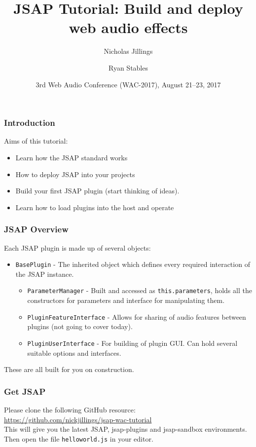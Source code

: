 \documentclass{beamer}
\title[JSAP]{JSAP Tutorial: Build and deploy web audio effects}
\author[Jillings and Stables]%
{Nicholas Jillings \and Ryan Stables}
\institute[BCU]
{
  Digital Media Technology Lab\\
  Birmingham City University\\
  Curzon Street, Birmingham, UK
}
\date[WAC 2017] %
{3rd Web Audio Conference (WAC-2017), August 21--23, 2017}
\begin{document}
 
\frame{\titlepage}

\begin{frame}
\frametitle{Introduction}

Aims of this tutorial:
\begin{itemize}
\item Learn how the JSAP standard works
\item How to deploy JSAP into your projects
\item Build your first JSAP plugin (start thinking of ideas).
\item Learn how to load plugins into the host and operate
\end{itemize}

\end{frame}

\begin{frame}
\frametitle{JSAP Overview}
Each JSAP plugin is made up of several objects:
\begin{itemize}
\item \texttt{BasePlugin} - The inherited object which defines every required interaction of the JSAP instance.
\begin{itemize}
\item \texttt{ParameterManager} - Built and accessed as \texttt{this.parameters}, holds all the constructors for parameters and interface for manipulating them.
\item \texttt{PluginFeatureInterface} - Allows for sharing of audio features between plugins (not going to cover today).
\item \texttt{PluginUserInterface} - For building of plugin GUI. Can hold several suitable options and interfaces.
\end{itemize}
\end{itemize}
These are all built for you on construction.
\end{frame}

\begin{frame}
\frametitle{Get JSAP}
Please clone the following GitHub resource:\\
\url{https://github.com/nickjillings/jsap-wac-tutorial}\\
This will give you the latest JSAP, jsap-plugins and jsap-sandbox environments.\\
Then open the file \texttt{helloworld.js} in your editor.\\
\end{frame}
\end{document}
